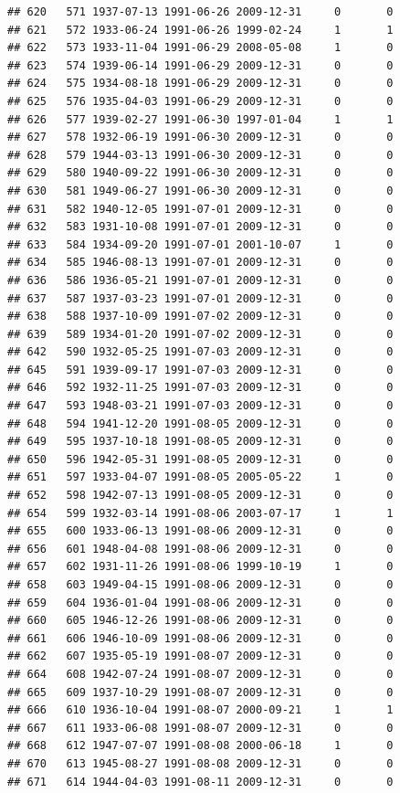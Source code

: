 \documentclass[
]{book}
\begin{document}
\begin{verbatim}
## 620   571 1937-07-13 1991-06-26 2009-12-31     0       0
## 621   572 1933-06-24 1991-06-26 1999-02-24     1       1
## 622   573 1933-11-04 1991-06-29 2008-05-08     1       0
## 623   574 1939-06-14 1991-06-29 2009-12-31     0       0
## 624   575 1934-08-18 1991-06-29 2009-12-31     0       0
## 625   576 1935-04-03 1991-06-29 2009-12-31     0       0
## 626   577 1939-02-27 1991-06-30 1997-01-04     1       1
## 627   578 1932-06-19 1991-06-30 2009-12-31     0       0
## 628   579 1944-03-13 1991-06-30 2009-12-31     0       0
## 629   580 1940-09-22 1991-06-30 2009-12-31     0       0
## 630   581 1949-06-27 1991-06-30 2009-12-31     0       0
## 631   582 1940-12-05 1991-07-01 2009-12-31     0       0
## 632   583 1931-10-08 1991-07-01 2009-12-31     0       0
## 633   584 1934-09-20 1991-07-01 2001-10-07     1       0
## 634   585 1946-08-13 1991-07-01 2009-12-31     0       0
## 636   586 1936-05-21 1991-07-01 2009-12-31     0       0
## 637   587 1937-03-23 1991-07-01 2009-12-31     0       0
## 638   588 1937-10-09 1991-07-02 2009-12-31     0       0
## 639   589 1934-01-20 1991-07-02 2009-12-31     0       0
## 642   590 1932-05-25 1991-07-03 2009-12-31     0       0
## 645   591 1939-09-17 1991-07-03 2009-12-31     0       0
## 646   592 1932-11-25 1991-07-03 2009-12-31     0       0
## 647   593 1948-03-21 1991-07-03 2009-12-31     0       0
## 648   594 1941-12-20 1991-08-05 2009-12-31     0       0
## 649   595 1937-10-18 1991-08-05 2009-12-31     0       0
## 650   596 1942-05-31 1991-08-05 2009-12-31     0       0
## 651   597 1933-04-07 1991-08-05 2005-05-22     1       0
## 652   598 1942-07-13 1991-08-05 2009-12-31     0       0
## 654   599 1932-03-14 1991-08-06 2003-07-17     1       1
## 655   600 1933-06-13 1991-08-06 2009-12-31     0       0
## 656   601 1948-04-08 1991-08-06 2009-12-31     0       0
## 657   602 1931-11-26 1991-08-06 1999-10-19     1       0
## 658   603 1949-04-15 1991-08-06 2009-12-31     0       0
## 659   604 1936-01-04 1991-08-06 2009-12-31     0       0
## 660   605 1946-12-26 1991-08-06 2009-12-31     0       0
## 661   606 1946-10-09 1991-08-06 2009-12-31     0       0
## 662   607 1935-05-19 1991-08-07 2009-12-31     0       0
## 664   608 1942-07-24 1991-08-07 2009-12-31     0       0
## 665   609 1937-10-29 1991-08-07 2009-12-31     0       0
## 666   610 1936-10-04 1991-08-07 2000-09-21     1       1
## 667   611 1933-06-08 1991-08-07 2009-12-31     0       0
## 668   612 1947-07-07 1991-08-08 2000-06-18     1       0
## 670   613 1945-08-27 1991-08-08 2009-12-31     0       0
## 671   614 1944-04-03 1991-08-11 2009-12-31     0       0

\end{verbatim}
\end{document}

